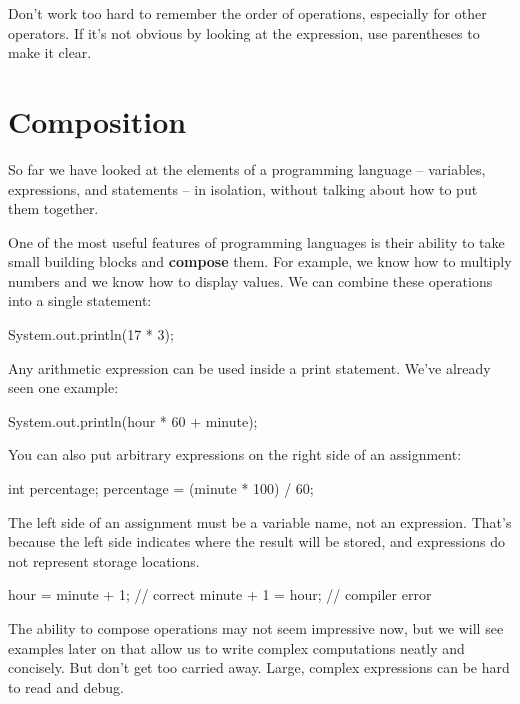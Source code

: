 \documentclass[12pt]{book}
\theoremstyle{exercise}
\begin{document}
Don't work too hard to remember the order of operations, especially for other operators.
If it's not obvious by looking at the expression, use parentheses to make it clear.


\section{Composition}


So far we have looked at the elements of a programming language -- variables, expressions, and statements -- in isolation, without talking about how to put them together.

One of the most useful features of programming languages is their ability to take small building blocks and {\bf compose} them.
For example, we know how to multiply numbers and we know how to display values.
We can combine these operations into a single statement:

\begin{code}
System.out.println(17 * 3);
\end{code}

Any arithmetic expression can be used inside a print statement.
We've already seen one example:

\begin{code}
System.out.println(hour * 60 + minute);
\end{code}

You can also put arbitrary expressions on the right side of an assignment:

\begin{code}
int percentage;
percentage = (minute * 100) / 60;
\end{code}

The left side of an assignment must be a variable name, not an expression.
That's because the left side indicates where the result will be stored, and expressions do not represent storage locations.

\begin{code}
hour = minute + 1;  // correct
minute + 1 = hour;  // compiler error
\end{code}


The ability to compose operations may not seem impressive now, but we will see examples later on that allow us to write complex computations neatly and concisely.
But don't get too carried away.
Large, complex expressions can be hard to read and debug.
\end{document}
